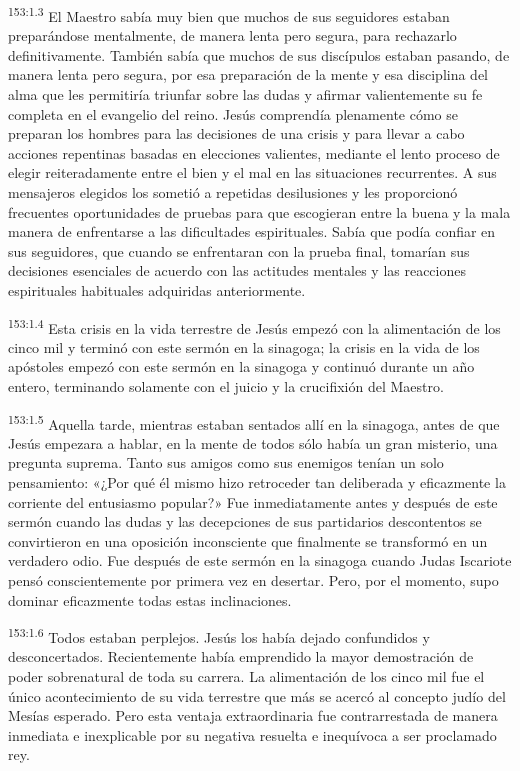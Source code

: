 \par 
\textsuperscript{153:1.3} El Maestro sabía muy bien que muchos de sus seguidores estaban preparándose mentalmente, de manera lenta pero segura, para rechazarlo definitivamente. También sabía que muchos de sus discípulos estaban pasando, de manera lenta pero segura, por esa preparación de la mente y esa disciplina del alma que les permitiría triunfar sobre las dudas y afirmar valientemente su fe completa en el evangelio del reino. Jesús comprendía plenamente cómo se preparan los hombres para las decisiones de una crisis y para llevar a cabo acciones repentinas basadas en elecciones valientes, mediante el lento proceso de elegir reiteradamente entre el bien y el mal en las situaciones recurrentes. A sus mensajeros elegidos los sometió a repetidas desilusiones y les proporcionó frecuentes oportunidades de pruebas para que escogieran entre la buena y la mala manera de enfrentarse a las dificultades espirituales. Sabía que podía confiar en sus seguidores, que cuando se enfrentaran con la prueba final, tomarían sus decisiones esenciales de acuerdo con las actitudes mentales y las reacciones espirituales habituales adquiridas anteriormente.

\par 
\textsuperscript{153:1.4} Esta crisis en la vida terrestre de Jesús empezó con la alimentación de los cinco mil y terminó con este sermón en la sinagoga; la crisis en la vida de los apóstoles empezó con este sermón en la sinagoga y continuó durante un año entero, terminando solamente con el juicio y la crucifixión del Maestro.

\par 
\textsuperscript{153:1.5} Aquella tarde, mientras estaban sentados allí en la sinagoga, antes de que Jesús empezara a hablar, en la mente de todos sólo había un gran misterio, una pregunta suprema. Tanto sus amigos como sus enemigos tenían un solo pensamiento: «¿Por qué él mismo hizo retroceder tan deliberada y eficazmente la corriente del entusiasmo popular?» Fue inmediatamente antes y después de este sermón cuando las dudas y las decepciones de sus partidarios descontentos se convirtieron en una oposición inconsciente que finalmente se transformó en un verdadero odio. Fue después de este sermón en la sinagoga cuando Judas Iscariote pensó conscientemente por primera vez en desertar. Pero, por el momento, supo dominar eficazmente todas estas inclinaciones.

\par 
\textsuperscript{153:1.6} Todos estaban perplejos. Jesús los había dejado confundidos y desconcertados. Recientemente había emprendido la mayor demostración de poder sobrenatural de toda su carrera. La alimentación de los cinco mil fue el único acontecimiento de su vida terrestre que más se acercó al concepto judío del Mesías esperado. Pero esta ventaja extraordinaria fue contrarrestada de manera inmediata e inexplicable por su negativa resuelta e inequívoca a ser proclamado rey.

